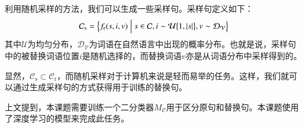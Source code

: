利用随机采样的方法，我们可以生成一些采样句。采样句定义如下：
\begin{equation}
\mathcal{C}_\text{s} = \Bigl\{f_\text{r}(s, i, v) \Bigm| s \in \mathcal{C}, i \sim \mathcal{U}\bigl\{1, |s|\bigr\}, v \sim \mathcal{D}_\mathcal{V}\Bigr\}
\end{equation}
其中$\mathcal{U}$为均匀分布，$\mathcal{D}_\mathcal{V}$为词语在自然语言中出现的概率分布。也就是说，采样句中的被替换词语位置$i$是随机选择的，而替换词语$v$亦是从词语分布中采样得到的。

显然，$\mathcal{C}_\text{s} \subset \mathcal{C}_\text{r}$，而随机采样对于计算机来说是轻而易举的任务。这样，我们就可以通过生成采样句的方式获得用于训练的替换句。

上文提到，本课题需要训练一个二分类器$M_\mathcal{C}$用于区分原句和替换句。本课题使用了深度学习的模型来完成此任务。